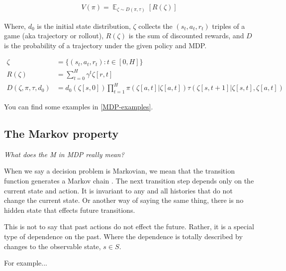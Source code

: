 \begin{align*}
V(\pi) = \mathop{\mathbb E}_{\zeta \sim D(\pi, \tau)} [R(\zeta)]
\end{align*}


Where, $d_0$ is the initial state distribution, $\zeta$ collects the $(s_t, a_t, r_t)$ triples of a game (aka trajectory or rollout),
$R(\zeta)$ is the sum of discounted rewards, and $D$ is the probability of a trajectory under the given policy and MDP.

\begin{align}
\zeta &= \{(s_t, a_t, r_t) : t \in [0, H]\} \tag{trajectory} \\
R(\zeta) &=\sum_{t=0}^H \gamma^t \zeta[r, t] \tag{Return} \\
D(\zeta, \pi, \tau, d_0) &= d_0(\zeta[s, 0]) \prod_{t=1}^{H} \pi(\zeta[a, t]|\zeta[a, t]) \tau(\zeta[s, t+1]|\zeta[s, t], \zeta[a, t]) \tag{p(traj)}
\end{align}


You can find some examples in \ref{MDP-examples}.

\hypertarget{the-markov-property}{%
\subsection{The Markov property}\label{the-markov-property}}

\begin{displayquote}
  \textit{What does the M in MDP really mean?}
\end{displayquote}

When we say a decision problem is Markovian, we mean that the transition
function generates a Markov chain \cite{Markov2006}. The next transition step depends only
on the current state and action. It is invariant to any and all histories that do not
change the current state. Or another way of saying the same thing, there is no hidden state
that effects future transitions.

This is not to say that past actions do not effect the future. Rather,
it is a special type of dependence on the past. Where the dependence is
totally described by changes to the observable state, $s\in S$.

{\color{red}For example...}



